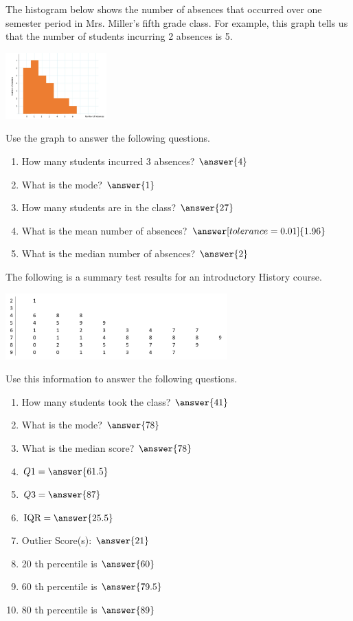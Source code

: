 \documentclass{ximera}
\begin{document}
\begin{problem}\label{prob:140hom2prob3}
The histogram below shows the number of absences that occurred over one semester period in Mrs. Miller's fifth grade class.  For example, this graph tells us that the number of students incurring 2 absences is 5.

\begin{image}
   \includegraphics[height=1in]{140H2pic6.jpg}
 \end{image}
 
 Use the graph to answer the following questions.
 
 \begin{enumerate}
     \item How many students incurred 3 absences? $\answer{4}$
     \item What is the mode? $\answer{1}$
     \item How many students are in the class? $\answer{27}$
     \item What is the mean number of absences? $\answer[tolerance=0.01]{1.96}$
     \item What is the median number of absences? $\answer{2}$
 \end{enumerate}
\end{problem}

\begin{problem}\label{prob:140hom2prob4}
The following is a summary test results for an introductory History course.
\begin{image}
   \includegraphics[height=1in]{140H2pic1.jpg}
 \end{image}
 
 Use this information to answer the following questions.
 
 \begin{enumerate}
     \item How many students took the class? $\answer{41}$
     \item What is the mode? $\answer{78}$
     \item What is the median score? $\answer{78}$
     \item $Q1=\answer{61.5}$
     \item $Q3=\answer{87}$
     \item $\mbox{IQR}=\answer{25.5}$
     \item Outlier Score(s): $\answer{21}$
     \item 20 th percentile is $\answer{60}$
     \item 60 th percentile is $\answer{79.5}$
     \item 80 th percentile is $\answer{89}$
 \end{enumerate}
\end{problem}
\end{document}
